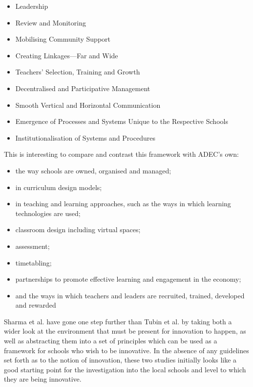 \begin{itemize}
\item Leadership
\item Review and Monitoring
\item Mobilising Community Support
\item Creating Linkages—Far and Wide
\item Teachers’ Selection, Training and Growth
\item Decentralised and Participative Management
\item Smooth Vertical and Horizontal Communication
\item Emergence of Processes and Systems Unique to the Respective Schools
\item Institutionalisation of Systems and Procedures
\end{itemize}

This is interesting to compare and contrast this framework with ADEC's own:

\begin{itemize}
\item the way schools are owned, organised and managed; 
\item in curriculum design models; 
\item in teaching and learning approaches, such as the ways in which learning technologies are used; 
\item classroom design including virtual spaces; 
\item assessment; 
\item timetabling; 
\item partnerships to promote effective learning and engagement in the economy; 
\item and the ways in which teachers and leaders are recruited, trained, developed and rewarded
\end{itemize}

Sharma et al. have gone one step further than Tubin et al. by taking both a wider look at the environment that must be present for innovation to happen, as well as abstracting them into a set of principles which can be used as a framework for schools who wish to be innovative. In the absence of any guidelines set forth as to the notion of innovation, these two studies initially looks like a good starting point for the investigation into the local schools and level to which they are being innovative.
\cite{StopI4:online}